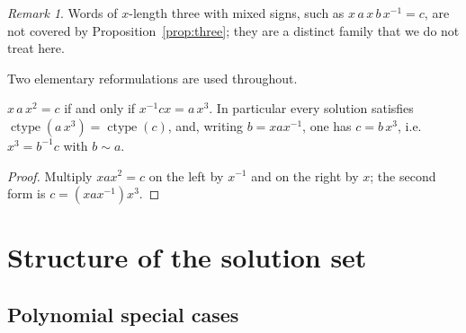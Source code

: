 \documentclass[preprint,12pt]{elsarticle}
\theoremstyle{definition}\newtheorem{defi}[thm]{Definition}\newtheorem{prob}[thm]{Problem}\newtheorem{obs}[thm]{Observation}
\theoremstyle{remark}\newtheorem{rem}[thm]{Remark}
\newcommand{\ctype}{\operatorname{ctype}}\DeclareMathOperator{\Cent}{C}\DeclareMathOperator{\supp}{supp}
\begin{document}
\begin{rem}
Words of $x$-length three with mixed signs, such as $x\,a\,x\,b\,x^{-1}=c$, are not covered by Proposition~\ref{prop:three}; they are a distinct family that we do not treat here.
\end{rem}

Two elementary reformulations are used throughout.
\begin{lem}\label{lem:conj}
$x\,a\,x^{2}=c$ if and only if $x^{-1}cx=a\,x^{3}$. In particular every solution satisfies $\ctype(a\,x^{3})=\ctype(c)$, and, writing $b=xax^{-1}$, one has $c=b\,x^{3}$, i.e.\ $x^{3}=b^{-1}c$ with $b\sim a$.
\end{lem}
\begin{proof}
Multiply $xax^{2}=c$ on the left by $x^{-1}$ and on the right by $x$; the second form is $c=(xax^{-1})x^{3}$.
\end{proof}

\section{Structure of the solution set}\label{sec:struct}

\subsection{Polynomial special cases}
\end{document}
